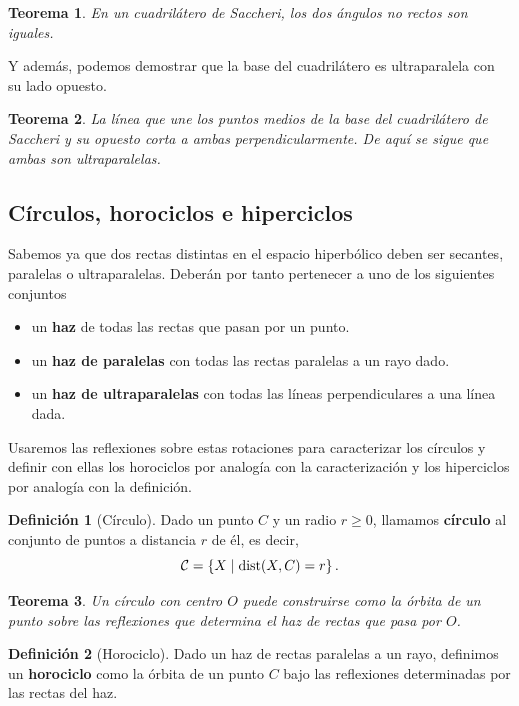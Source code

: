 \documentclass{article}
\theoremstyle{plain}
\newtheorem{theorem}{Teorema}
\theoremstyle{definition}
\newtheorem{definition}{Definición}
\theoremstyle{remark}
\begin{document}
\begin{theorem}
  En un cuadrilátero de Saccheri, los dos ángulos no rectos son
  iguales.
\end{theorem}

Y además, podemos demostrar que la base del cuadrilátero es ultraparalela
con su lado opuesto.

\begin{theorem}
  La línea que une los puntos medios de la base del cuadrilátero de
  Saccheri y su opuesto corta a ambas perpendicularmente. De aquí se
  sigue que ambas son ultraparalelas.
\end{theorem}



\subsection{Círculos, horociclos e hiperciclos}
Sabemos ya que dos rectas distintas en el espacio hiperbólico
deben ser secantes, paralelas o ultraparalelas. Deberán por tanto
pertenecer a uno de los siguientes conjuntos

\begin{itemize}
\item un \textbf{haz} de todas las rectas que pasan por un punto.
\item un \textbf{haz de paralelas} con todas las rectas paralelas a un
  rayo dado.
\item un \textbf{haz de ultraparalelas} con todas las líneas
  perpendiculares a una línea dada.
\end{itemize}

Usaremos las reflexiones sobre estas rotaciones para caracterizar los
círculos y definir con ellas los horociclos por analogía con la
caracterización y los hiperciclos por analogía con la definición.

\begin{definition}[Círculo]
  Dado un punto $C$ y un radio $r \geq 0$, llamamos \textbf{círculo}
  al conjunto de puntos a distancia $r$ de él, es decir,
  \[{\cal C} = \left\{ X \mid \mathrm{dist}(X,C) = r \right\}.\]
\end{definition}

\begin{theorem}
  Un círculo con centro $O$ puede construirse como la órbita de un punto
  sobre las reflexiones que determina el haz de rectas que pasa por $O$.
\end{theorem}

\begin{definition}[Horociclo]
  Dado un haz de rectas paralelas a un rayo, definimos un \textbf{horociclo} como
  la órbita de un punto $C$ bajo las reflexiones determinadas por las rectas del
  haz. \cite{coxeter}
\end{definition}
\end{document}
